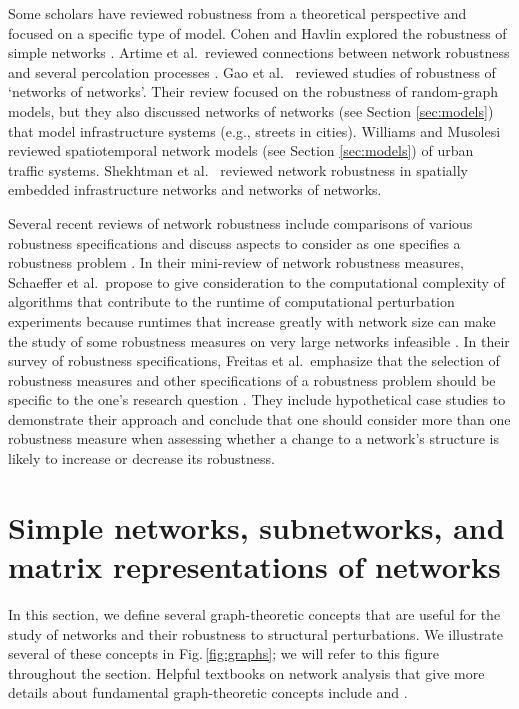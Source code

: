 \documentclass{comnet-mod}
\begin{document}
Some scholars have reviewed robustness from a theoretical perspective and focused on a specific type of model. Cohen and Havlin explored the robustness of simple networks \cite{Cohen2010}.
Artime et al.~reviewed connections between network robustness and several percolation processes \cite{Artime2024}. Gao et al.~\cite{Gao2015} reviewed studies of robustness of `networks of networks'. Their review focused on the robustness of random-graph models, but they also discussed networks of networks (see Section \ref{sec:models}) that model infrastructure systems (e.g., streets in cities). Williams and Musolesi~\cite{Williams2016} reviewed spatiotemporal network models (see Section \ref{sec:models}) of urban traffic systems. Shekhtman et al.~\cite{Shekhtman2018} reviewed network robustness in spatially embedded infrastructure networks and networks of networks.

Several recent reviews of network robustness include comparisons of various robustness specifications and discuss aspects to consider as one specifies a robustness problem \cite{Schaeffer2021, Freitas2022}. In their mini-review of network robustness measures, Schaeffer et al.~propose to give consideration to the computational complexity of algorithms that contribute to the runtime of computational perturbation experiments because runtimes that increase greatly with network size can make the study of some robustness measures on very large networks infeasible \cite{Schaeffer2021}. In their survey of robustness specifications, Freitas et al.~emphasize that the selection of robustness measures and other specifications of a robustness problem should be specific to the one's research question \cite{Freitas2022}. They include hypothetical case studies to demonstrate their approach and conclude that one should consider more than one robustness measure when assessing whether a change to a network's structure is likely to increase or decrease its robustness.


\section{Simple networks, subnetworks, and matrix representations of networks}\label{sec:review:graphs}

In this section, we define several graph-theoretic concepts that are useful for the study of networks and their robustness to structural perturbations. We illustrate several of these concepts in Fig.\,\ref{fig:graphs}; we will refer to this figure throughout the section. Helpful textbooks on network analysis that give more details about fundamental graph-theoretic concepts include \cite{Newman2018} and \cite{bullo2022}.
\end{document}
